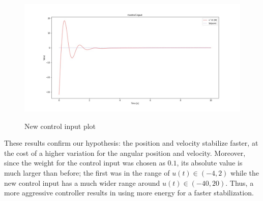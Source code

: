 \begin{figure}[h!]
    \centering
    \includegraphics[width=\textwidth]{images/2-pendulum_input.jpg}
    \label{fig:pen_in}
    \caption{New control input plot}
\end{figure}

These results confirm our hypothesis: the position and velocity stabilize faster, at the cost of a higher variation for the angular position and velocity. Moreover, since the weight for the control input was chosen as $0.1$, its absolute value is much larger than before; the first was in the range of $u(t) \in (-4, 2)$ while the new control input has a much wider range around $u(t) \in (-40, 20)$. Thus, a more aggressive controller results in using more energy for a faster stabilization.